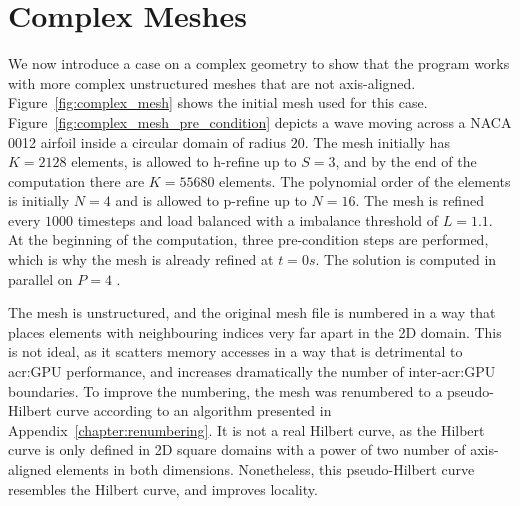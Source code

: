 \section{Complex Meshes}\label{section:results:complex_meshes}

We now introduce a case on a complex geometry to show that the program works with more complex
unstructured meshes that are not axis-aligned. Figure~\ref{fig:complex_mesh} shows the initial mesh
used for this case. Figure~\ref{fig:complex_mesh_pre_condition} depicts a wave moving across a NACA
0012 airfoil inside a circular domain of radius \(20\). The mesh initially has \(K = 2128\)
elements, is allowed to h-refine up to \(S = 3\), and by the end of the computation there are \(K =
55680\) elements. The polynomial order of the elements is initially \(N = 4\) and is allowed to
p-refine up to \(N = 16\). The mesh is refined every \(1000\) timesteps and load balanced with a
imbalance threshold of \(L = 1.1\). At the beginning of the computation, three pre-condition steps
are performed, which is why the mesh is already refined at \(t = 0 s\). The solution is computed in
parallel on \(P = 4\) .

The mesh is unstructured, and the original mesh file is numbered in a way that places elements with
neighbouring indices very far apart in the 2D domain. This is not ideal, as it scatters memory
accesses in a way that is detrimental to \acrshort{acr:GPU} performance, and increases dramatically
the number of inter-\acrshort{acr:GPU} boundaries. To improve the numbering, the mesh was renumbered
to a pseudo-Hilbert curve according to an algorithm presented in Appendix~\ref{chapter:renumbering}.
It is not a real Hilbert curve, as the Hilbert curve is only defined in 2D square domains with a
power of two number of axis-aligned elements in both dimensions. Nonetheless, this pseudo-Hilbert
curve resembles the Hilbert curve, and improves locality.

